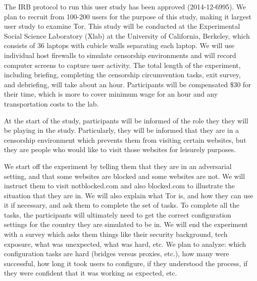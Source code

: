 \documentclass{template}
\begin{document}
The IRB protocol to run this user study has been approved (2014-12-6995). 
We plan to recruit from 100-200 users for the purpose of this study, 
making it largest user study to examine Tor.  This study will be conducted at the 
Experimental Social Science Laboratory (Xlab)
at the University of California, Berkeley, which consists of 36 laptops with 
cubicle walls separating each laptop. We will use individual host firewalls to simulate
censorship environments and will record computer screens to capture 
user activity. The total length of the experiment, including briefing, completing the censorship 
circumvention tasks, exit survey, and debriefing, will take about an hour. 
Participants will be compensated \$30 for their time, which is more to cover 
minimum wage for an hour and any transportation costs to the lab.  \\

{\color {red}
At the start of the study, participants will be informed
of the role they they will be playing in the study. Particularly,
they will be informed that they are in a censorship environment
which prevents them from visiting certain websites, but they
are people who would like to visit those websites for 
leisurely purposes. 


We start off the experiment by telling them that they are in an adversarial setting, and that some websites are blocked and some websites are not. We will instruct them to visit notblocked.com and also blocked.com to illustrate the situation that they are in. We will also explain what Tor is, and how they can use it if necessary, and ask them to complete the set of tasks. To complete all the tasks, the participants will ultimately need to get the correct configuration settings for the country they are simulated to be in. We will end the experiment with a survey which asks them things like their security background, tech exposure, what was unexpected, what was hard, etc. We plan to analyze: which configuration tasks are hard (bridges versus proxies, etc.), how many were successful, how long it took users to configure, if they understood the process, if they were confident that it was working as expected, etc.} \\
\end{document}
